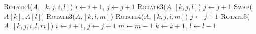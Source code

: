 \documentclass{article}
\begin{document}
\begin{algorithm}[H]
\begin{algorithmic}[1]
            \EndWhile
         
             
                    \State \textsc{Rotate4}($A, [k, j, i, l]$)
                    \State $i \gets i + 1$, $j \gets j + 1$
                    \State \textsc{Rotate3}($A, [k, j, l]$)
                    \State $j \gets j + 1$
                \Else
                    \State \textsc{Swap}($A[k], A[l]$)
                \EndIf
            \Else {}
                    \State \textsc{Rotate3}($A, [k, l, m]$)
                    \State \textsc{Rotate4}($A, [k, j, l, m]$)
                    \State $j \gets j + 1$
                \Else
                    \State \textsc{Rotate5}($A, [k, j, i, l, m]$)
                    \State $i \gets i + 1$, $j \gets j + 1$
                \EndIf
                \State $m \gets m - 1$
            \EndIf
            \State $k \gets k + 1$, $l \gets l - 1$
        \EndIf
    \end{algorithmic}
\end{algorithm}
\end{document}
